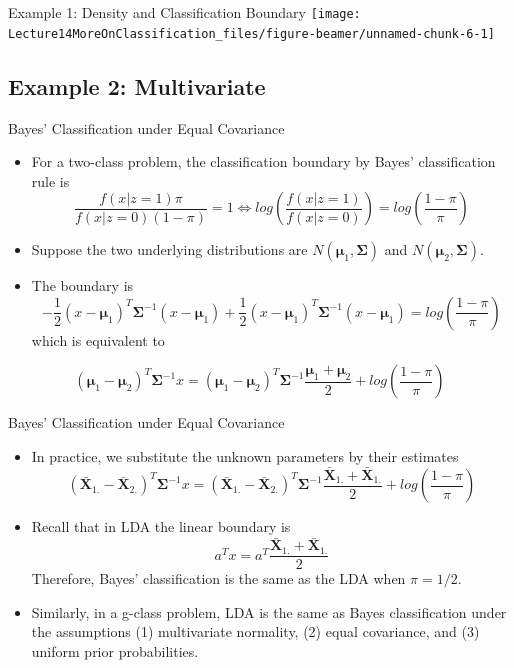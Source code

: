 \documentclass[
  ignorenonframetext,
]{beamer}
\begin{document}
\begin{frame}{Example 1: Density and Classification Boundary}
\protect\hypertarget{example-1-density-and-classification-boundary}{}
\texttt{[image: Lecture14MoreOnClassification\_files/figure-beamer/unnamed-chunk-6-1]}
\end{frame}

\hypertarget{example-2-multivariate}{%
\subsection{Example 2: Multivariate}\label{example-2-multivariate}}

\begin{frame}{Bayes' Classification under Equal Covariance}
\protect\hypertarget{bayes-classification-under-equal-covariance}{}
\begin{itemize}
\item
  For a two-class problem, the classification boundary by Bayes'
  classification rule is
  \[\frac{f(x|z=1)\pi}{f(x|z=0)(1-\pi)}=1\Leftrightarrow log(\frac{f(x|z=1)}{f(x|z=0)})=log(\frac{1-\pi}{\pi})\]
\item
  Suppose the two underlying distributions are
  \(N(\boldsymbol\mu_1, \boldsymbol \Sigma)\) and
  \(N(\boldsymbol\mu_2, \boldsymbol \Sigma)\).
\item
  The boundary is
  \[-\frac{1}{2}(x-\boldsymbol\mu_1)^T \boldsymbol\Sigma^{-1}(x-\boldsymbol\mu_1) + \frac{1}{2}(x-\boldsymbol\mu_1)^T \boldsymbol\Sigma^{-1}(x-\boldsymbol\mu_1)=log(\frac{1-\pi}{\pi})\]
  which is equivalent to
\end{itemize}

\[(\boldsymbol\mu_1 -\boldsymbol\mu_2)^T \boldsymbol\Sigma^{-1}x = (\boldsymbol\mu_1 -\boldsymbol\mu_2)^T\boldsymbol\Sigma^{-1}\frac{\boldsymbol\mu_1 + \boldsymbol\mu_2}{2} + log(\frac{1-\pi}{\pi})\]
\end{frame}

\begin{frame}{Bayes' Classification under Equal Covariance}
\protect\hypertarget{bayes-classification-under-equal-covariance-1}{}
\begin{itemize}
\item
  In practice, we substitute the unknown parameters by their estimates
  \[(\bar {\mathbf X}_{1.} -\bar {\mathbf X}_{2.})^T\boldsymbol\Sigma^{-1}x = (\bar {\mathbf X}_{1.} -\bar {\mathbf X}_{2.})^T \boldsymbol\Sigma^{-1}\frac{\bar {\mathbf X}_{1.} + \bar {\mathbf X}_{1.}}{2} + log(\frac{1-\pi}{\pi})\]
\item
  Recall that in LDA the linear boundary is
  \[a^Tx=a^T\frac{\bar {\mathbf X}_{1.} + \bar {\mathbf X}_{1.}}{2}\]
  Therefore, Bayes' classification is the same as the LDA when
  \(\pi=1/2\).
\item
  Similarly, in a g-class problem, LDA is the same as Bayes
  classification under the assumptions (1) multivariate normality, (2)
  equal covariance, and (3) uniform prior probabilities.
\end{itemize}
\end{frame}
\end{document}
